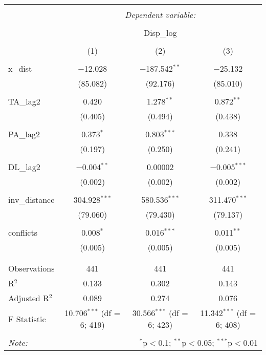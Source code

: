 
\begin{table}[!htbp] \centering 
  \caption{} 
  \label{} 
\begin{tabular}{@{\extracolsep{5pt}}lccc} 
\\[-1.8ex]\hline 
\hline \\[-1.8ex] 
 & \multicolumn{3}{c}{\textit{Dependent variable:}} \\ 
\cline{2-4} 
\\[-1.8ex] & \multicolumn{3}{c}{Disp\_log} \\ 
\\[-1.8ex] & (1) & (2) & (3)\\ 
\hline \\[-1.8ex] 
 x\_dist & $-$12.028 & $-$187.542$^{**}$ & $-$25.132 \\ 
  & (85.082) & (92.176) & (85.010) \\ 
  & & & \\ 
 TA\_lag2 & 0.420 & 1.278$^{**}$ & 0.872$^{**}$ \\ 
  & (0.405) & (0.494) & (0.438) \\ 
  & & & \\ 
 PA\_lag2 & 0.373$^{*}$ & 0.803$^{***}$ & 0.338 \\ 
  & (0.197) & (0.250) & (0.241) \\ 
  & & & \\ 
 DL\_lag2 & $-$0.004$^{**}$ & 0.00002 & $-$0.005$^{***}$ \\ 
  & (0.002) & (0.002) & (0.002) \\ 
  & & & \\ 
 inv\_distance & 304.928$^{***}$ & 580.536$^{***}$ & 311.470$^{***}$ \\ 
  & (79.060) & (79.430) & (79.137) \\ 
  & & & \\ 
 conflicts & 0.008$^{*}$ & 0.016$^{***}$ & 0.011$^{**}$ \\ 
  & (0.005) & (0.005) & (0.005) \\ 
  & & & \\ 
\hline \\[-1.8ex] 
Observations & 441 & 441 & 441 \\ 
R$^{2}$ & 0.133 & 0.302 & 0.143 \\ 
Adjusted R$^{2}$ & 0.089 & 0.274 & 0.076 \\ 
F Statistic & 10.706$^{***}$ (df = 6; 419) & 30.566$^{***}$ (df = 6; 423) & 11.342$^{***}$ (df = 6; 408) \\ 
\hline 
\hline \\[-1.8ex] 
\textit{Note:}  & \multicolumn{3}{r}{$^{*}$p$<$0.1; $^{**}$p$<$0.05; $^{***}$p$<$0.01} \\ 
\end{tabular} 
\end{table} 
